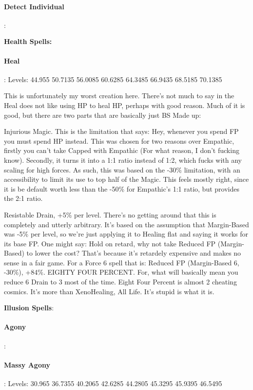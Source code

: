 \begin{multicols*}{2}
	\paragraph{Detect Individual}:
	
	\textbf{Health Spells:\\}
	
	\paragraph{Heal}: Levels: 44.955 50.7135 56.0085 60.6285 64.3485 66.9435 68.5185 70.1385
	
	This is unfortunately my worst creation here. There's not much to say in the Heal does not like using HP to heal HP, perhaps with good reason. Much of it is good, but there are two parts that are basically just BS Made up:
	
	Injurious Magic. This is the limitation that says: Hey, whenever you spend FP you must spend HP instead. This was chosen for two reasons over Empathic, firstly you can't take Capped with Empathic (For what reason, I don't fucking know). Secondly, it turns it into a 1:1 ratio instead of 1:2, which fucks with any scaling for high forces. As such, this was based on the -30\% limitation, with an accessibility to limit its use to top half of the Magic. This feels mostly right, since it is be default worth less than the -50\% for Empathic's 1:1 ratio, but provides the 2:1 ratio.
	
	Resistable Drain, +5\% per level. There's no getting around that this is completely and utterly arbitrary. It's based on the assumption that Margin-Based was -5\% per level, so we're just applying it to Healing flat and saying it works for its base FP. One might say: Hold on retard, why not take Reduced FP (Margin-Based) to lower the cost? That's because it's retardely expensive and makes no sense in a fair game. For a Force 6 spell that is: Reduced FP (Margin-Based 6, -30\%), +84\%. EIGHTY FOUR PERCENT. For, what will basically mean you reduce 6 Drain to 3 most of the time. Eight Four Percent is almost 2 cheating cosmics. It's more than XenoHealing, All Life. It's stupid is what it is.
	
	\textbf{Illusion Spells}:
	
	\paragraph{Agony}: 
	
	\paragraph{Massy Agony}: Levels: 30.965 36.7355 40.2065 42.6285 44.2805 45.3295 45.9395 46.5495
	

\end{multicols*}
